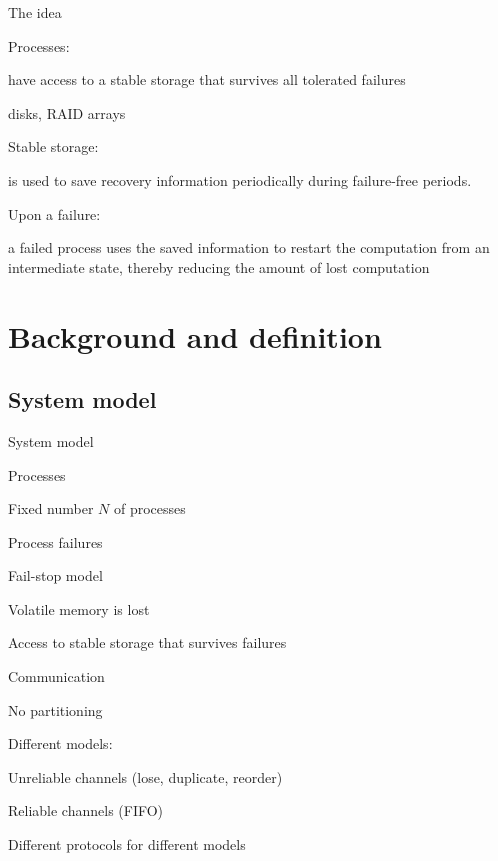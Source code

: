 \begin{frame}{The idea}
	
\BIL
\item \alert{Processes}:
\BI
\item have access to a stable storage that survives all tolerated failures 
\item disks, RAID arrays
\EI
\item \alert{Stable storage}:
\BI
\item is used to save recovery information periodically during failure-free periods.
\EI
\item \alert{Upon a failure}:
\BI
\item a failed process uses the saved information to restart the computation from an intermediate state, thereby reducing the amount of lost computation
\EI
\EIL
\end{frame}

\section{Background and definition}

\subsection{System model}

\begin{frame}{System model}

\begin{block}{Processes}
\BI
\item Fixed number $N$ of processes 
\item Process failures
\BI
\item Fail-stop model
\item Volatile memory is lost
\item Access to stable storage that survives failures
\EI
\EI
\end{block}
\begin{block}{Communication}
\BI
\item No partitioning
\item Different models:
 \BI 
  \item Unreliable channels (lose, duplicate, reorder) 
  \item Reliable channels (FIFO)
 \EI
\item Different protocols for different models
\EI
\end{block}
\end{frame}

